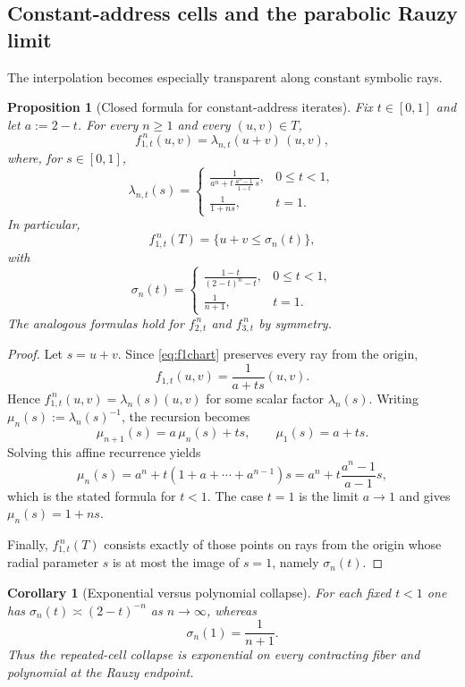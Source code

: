 \documentclass[11pt]{amsart}
\newtheorem{proposition}[proposition]{Proposition}
\newtheorem{corollary}[corollary]{Corollary}
\theoremstyle{definition}
\begin{document}
\subsection{Constant-address cells and the parabolic Rauzy limit}

The interpolation becomes especially transparent along constant symbolic rays.

\begin{proposition}[Closed formula for constant-address iterates]\label{prop:constantaddress}
Fix $t\in[0,1]$ and let $a:=2-t$. For every $n\ge1$ and every $(u,v)\in T$,
\[
 f_{1,t}^{\,n}(u,v)=\lambda_{n,t}(u+v)\,(u,v),
\]
where, for $s\in[0,1]$,
\[
\lambda_{n,t}(s)=
\begin{cases}
\displaystyle \frac{1}{a^n+t\,\frac{a^n-1}{1-t}\,s},& 0\le t<1,\\[2ex]
\displaystyle \frac{1}{1+ns},& t=1.
\end{cases}
\]
In particular,
\[
 f_{1,t}^{\,n}(T)=\{u+v\le \sigma_n(t)\},
\]
with
\[
\sigma_n(t)=
\begin{cases}
\displaystyle \frac{1-t}{(2-t)^n-t},& 0\le t<1,\\[2ex]
\displaystyle \frac{1}{n+1},& t=1.
\end{cases}
\]
The analogous formulas hold for $f_{2,t}^{\,n}$ and $f_{3,t}^{\,n}$ by symmetry.
\end{proposition}

\begin{proof}
Let $s=u+v$. Since \eqref{eq:f1chart} preserves every ray from the origin,
\[
 f_{1,t}(u,v)=\frac{1}{a+ts}(u,v).
\]
Hence $f_{1,t}^{\,n}(u,v)=\lambda_n(s)(u,v)$ for some scalar factor $\lambda_n(s)$. Writing $\mu_n(s):=\lambda_n(s)^{-1}$, the recursion becomes
\[
\mu_{n+1}(s)=a\,\mu_n(s)+ts,\qquad \mu_1(s)=a+ts.
\]
Solving this affine recurrence yields
\[
\mu_n(s)=a^n+t(1+a+\cdots+a^{n-1})s=a^n+t\frac{a^n-1}{a-1}s,
\]
which is the stated formula for $t<1$. The case $t=1$ is the limit $a\to1$ and gives $\mu_n(s)=1+ns$.

Finally, $f_{1,t}^{\,n}(T)$ consists exactly of those points on rays from the origin whose radial parameter $s$ is at most the image of $s=1$, namely $\sigma_n(t)$.
\end{proof}

\begin{corollary}[Exponential versus polynomial collapse]\label{cor:collapse}
For each fixed $t<1$ one has $\sigma_n(t)\asymp (2-t)^{-n}$ as $n\to\infty$, whereas
\[
\sigma_n(1)=\frac{1}{n+1}.
\]
Thus the repeated-cell collapse is exponential on every contracting fiber and polynomial at the Rauzy endpoint.
\end{corollary}
\end{document}
